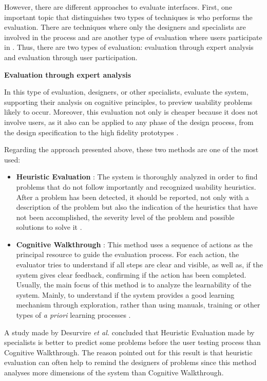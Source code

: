 However, there are different approaches to evaluate interfaces. First, one important topic that distinguishes two types of techniques is who performs the evaluation. There are techniques where only the designers and specialists are involved in the process and are another type of evaluation where users participate in \cite{humanComputerInteraction}. Thus, there are two types of evaluation: evaluation through expert analysis and evaluation through user participation.

\bigskip

\textbf{Evaluation through expert analysis}

In this type of evaluation, designers, or other specialists, evaluate the system, supporting their analysis on cognitive principles, to preview usability problems likely to occur. Moreover, this evaluation not only is cheaper because it does not involve users, as it also can be applied to any phase of the design process, from the design specification to the high fidelity prototypes \cite{humanComputerInteraction}.

Regarding the approach presented above, these two methods are one of the most used:

\begin{itemize}
	\item \textbf{Heuristic Evaluation} \cite{heuristicEvaluationOfUserInterfaces}: The system is thoroughly analyzed in order to find problems that do not follow importantly and recognized usability heuristics. After a problem has been detected, it should be reported, not only with a description of the problem but also the indication of the heuristics that have not been accomplished, the severity level of the problem and possible solutions to solve it \cite{usabilityEngineering}.
	\item \textbf{Cognitive Walkthrough} \cite{cognitiveWalkthroughs}: This method uses a sequence of actions as the principal resource to guide the evaluation process. For each action, the evaluator tries to understand if all steps are clear and visible, as well as, if the system gives clear feedback, confirming if the action has been completed. Usually, the main focus of this method is to analyze the learnability of the system. Mainly, to understand if the system provides a good learning mechanism through exploration, rather than using manuals, training or other types of \textit{a priori} learning processes \cite{humanComputerInteraction}.
\end{itemize}

A study made by Desurvire \textit{et al.} \cite{WhatIsGainedAndLostWhenUsingMethodsOtherThanEmpiricalTesting} concluded that Heuristic Evaluation made by specialists is better to predict some problems before the user testing process than Cognitive Walkthrough. The reason pointed out for this result is that heuristic evaluation can often help to remind the designers of problems since this method analyses more dimensions of the system than Cognitive Walkthrough.

